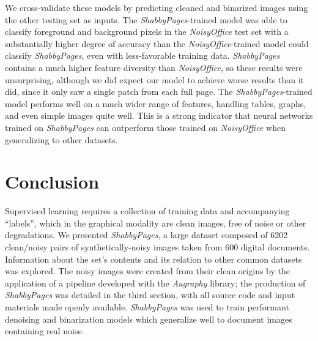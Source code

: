 \documentclass[runningheads]{llncs}
\begin{document}
We cross-validate these models by predicting cleaned and binarized images using the other testing set as inputs.
The \emph{ShabbyPages}-trained model was able to classify foreground and background pixels in the \emph{NoisyOffice} test set with a substantially higher degree of accuracy than the \emph{NoisyOffice}-trained model could classify \emph{ShabbyPages}, even with less-favorable training data.
\emph{ShabbyPages} contains a much higher feature diversity than \emph{NoisyOffice}, so these results were unsurprising, although we did expect our model to achieve worse results than it did, since it only saw a single patch from each full page.
The \emph{ShabbyPages}-trained model performs well on a much wider range of features, handling tables, graphs, and even simple images quite well.
This is a strong indicator that neural networks trained on \emph{ShabbyPages} can outperform those trained on \emph{NoisyOffice} when generalizing to other datasets.

\section{Conclusion}
Supervised learning requires a collection of training data and accompanying ``labels'', which in the graphical modality are clean images, free of noise or other degradations.
We presented \emph{ShabbyPages}, a large dataset composed of 6202 clean/noisy pairs of synthetically-noisy images taken from 600 digital documents.
Information about the set's contents and its relation to other common datasets was explored.
The noisy images were created from their clean origins by the application of a pipeline developed with the \emph{Augraphy} library; the production of \emph{ShabbyPages} was detailed in the third section, with all source code and input materials made openly available.
\emph{ShabbyPages} was used to train performant denoising and binarization models which generalize well to document images containing real noise.



\end{document}
